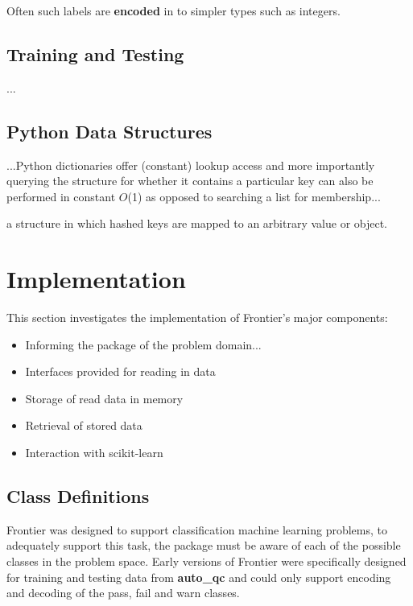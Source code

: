 Often such labels are \textbf{encoded} in to simpler types such as integers.


\subsection{Training and Testing}

...

\subsection{Python Data Structures}
\label{sec:python-structures}

...Python
dictionaries offer (constant) lookup access and more importantly querying the
structure for whether it contains a particular key can also be performed in
constant $O$(1) as opposed to searching a list for
membership\citep{py:timecomplexity}...

a structure in
which hashed keys are mapped to an arbitrary value or object.


\section{Implementation}

This section investigates the implementation of Frontier's major components:

\begin{itemize}
    \item Informing the package of the problem domain...
    \item Interfaces provided for reading in data
    \item Storage of read data in memory
    \item Retrieval of stored data
    \item Interaction with scikit-learn
\end{itemize}


\subsection{Class Definitions}
\label{chap:classes}

Frontier was designed to support classification machine learning problems, to
adequately support this task, the package must be aware of each of the possible
classes in the problem space. Early versions of Frontier were specifically
designed for training and testing data from \textbf{auto\_qc} and could only
support encoding and decoding of the pass, fail and warn classes.

